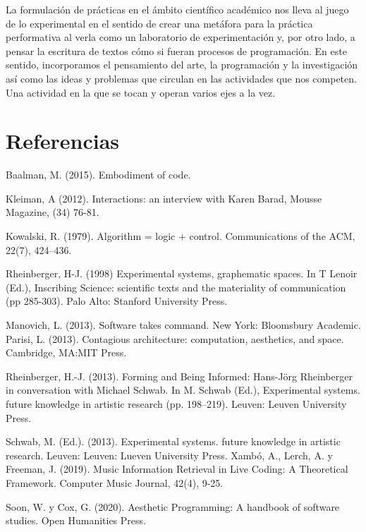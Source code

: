 La formulación de prácticas en el ámbito científico académico nos lleva al juego de lo experimental en el sentido de crear una metáfora para la práctica performativa al verla como un laboratorio de experimentación y, por otro lado, a pensar la escritura de textos cómo si fueran procesos de programación. En este sentido, incorporamos el pensamiento del arte, la programación y la investigación así como las ideas y problemas que circulan en las actividades que nos competen. Una actividad en la que se tocan y operan varios ejes a la vez.

\section{Referencias}

Baalman, M. (2015). Embodiment of code.

Kleiman, A (2012). Interactions: an interview with Karen Barad, Mousse Magazine, (34) 76-81.

Kowalski, R. (1979). Algorithm = logic + control. Communications of the ACM, 22(7), 424–436.

Rheinberger, H-J. (1998) Experimental systems, graphematic spaces. In T Lenoir (Ed.), Inscribing Science: scientific texts and the materiality of communication (pp 285-303). Palo Alto: Stanford University Press.

Manovich, L. (2013). Software takes command. New York: Bloomsbury Academic.
Parisi, L. (2013). Contagious architecture: computation, aesthetics, and space. Cambridge, MA:MIT Press.

Rheinberger, H.-J. (2013). Forming and Being Informed: Hans-Jörg Rheinberger in conversation with Michael Schwab. In M. Schwab (Ed.), Experimental systems. future knowledge in artistic research (pp. 198–219). Leuven: Leuven University Press.

Schwab, M. (Ed.). (2013). Experimental systems. future knowledge in artistic research. Leuven: Leuven: Lueven University Press.
Xambó, A., Lerch, A. y Freeman, J. (2019). Music Information Retrieval in Live Coding: A Theoretical Framework. Computer Music Journal, 42(4), 9-25.

Soon, W. y Cox, G. (2020). Aesthetic Programming: A handbook of software studies. Open Humanities Press.

